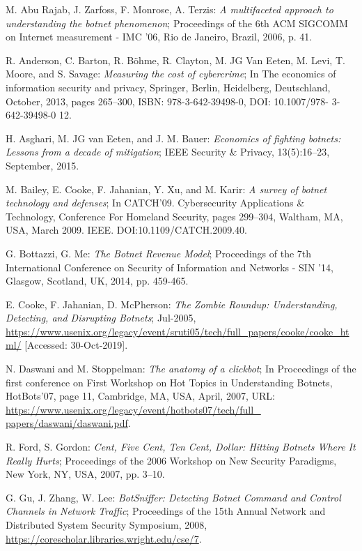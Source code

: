 \begin{thebibliography}{99}
 M. Abu Rajab, J. Zarfoss, F. Monrose, A. Terzis: \emph{A multifaceted approach to understanding the botnet phenomenon}; Proceedings of the 6th ACM SIGCOMM on Internet measurement  - IMC '06, Rio de Janeiro, Brazil, 2006, p. 41.

 R. Anderson, C. Barton, R. Böhme, R. Clayton, M. JG Van Eeten, M. Levi, T. Moore, and S. Savage: \emph{Measuring the cost of cybercrime}; In The economics of information security and privacy, Springer, Berlin, Heidelberg, Deutschland, October, 2013, pages 265–300, ISBN: 978-3-642-39498-0, DOI: 10.1007/978- 3-642-39498-0 12.

 H. Asghari, M. JG van Eeten, and J. M. Bauer: \emph{Economics of fighting botnets: Lessons from a decade of mitigation}; IEEE Security & Privacy, 13(5):16–23, September, 2015.

 M. Bailey, E. Cooke, F. Jahanian, Y. Xu, and M. Karir: \emph{A survey of botnet technology and defenses}; In CATCH’09. Cybersecurity Applications & Technology, Conference For Homeland Security, pages 299–304, Waltham, MA, USA, March 2009. IEEE. DOI:10.1109/CATCH.2009.40.

 G. Bottazzi, G. Me: \emph{The Botnet Revenue Model}; Proceedings of the 7th International Conference on Security of Information and Networks - SIN '14, Glasgow, Scotland, UK, 2014, pp. 459-465.

 E. Cooke, F. Jahanian, D. McPherson: \emph{The Zombie Roundup: Understanding, Detecting, and Disrupting Botnets}; Jul-2005, \url{https://www.usenix.org/legacy/event/sruti05/tech/full_papers/cooke/cooke_html/} [Accessed: 30-Oct-2019].

 N. Daswani and M. Stoppelman: \emph{The anatomy of a clickbot}; In Proceedings of the first conference on First Workshop on Hot Topics in Understanding Botnets, HotBots’07, page 11, Cambridge, MA, USA, April, 2007, URL: \url{https://www.usenix.org/legacy/event/hotbots07/tech/full_ papers/daswani/daswani.pdf}.

 R. Ford, S. Gordon: \emph{Cent, Five Cent, Ten Cent, Dollar: Hitting Botnets Where It Really Hurts}; Proceedings of the 2006 Workshop on New Security Paradigms, New York, NY, USA, 2007, pp. 3--10.

 G. Gu, J. Zhang, W. Lee: \emph{BotSniffer: Detecting Botnet Command and Control Channels in Network Traffic}; Proceedings of the 15th Annual Network and Distributed System Security Symposium, 2008, \url{https://corescholar.libraries.wright.edu/cse/7}.


\end{thebibliography}
